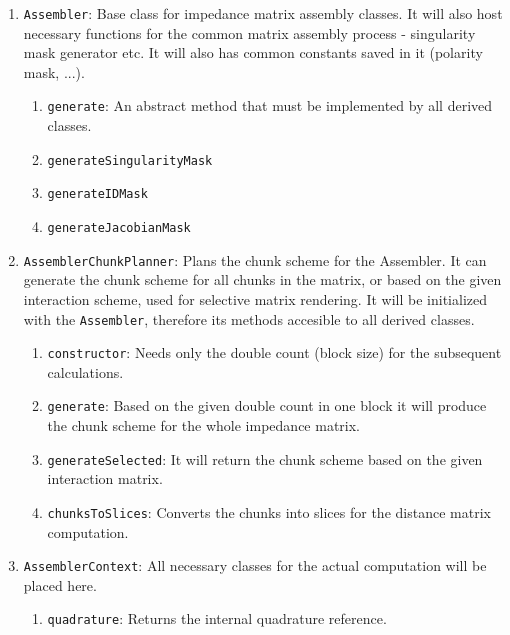 \documentclass[9pt]{article}
\begin{document}
\begin{enumerate}[label=\Roman*.]
\begin{enumerate}[label=\roman*.]
            \item \texttt{generateSameDir}
            \item \texttt{generateCrossDir}
        \end{enumerate}
        \item \texttt{Assembler}: Base class for impedance matrix assembly classes. It will also host necessary functions for the common matrix assembly process - singularity mask generator etc. It will also has common constants saved in it (polarity mask, ...).
        \begin{enumerate}[label=\roman*.]
            \item \texttt{generate}: An abstract method that must be implemented by all derived classes.
            \item \texttt{generateSingularityMask}
            \item \texttt{generateIDMask}
            \item \texttt{generateJacobianMask}
        \end{enumerate}
        \item \texttt{AssemblerChunkPlanner}: Plans the chunk scheme for the Assembler. It can generate the chunk scheme for all chunks in the matrix, or based on the given interaction scheme, used for selective matrix rendering. It will be initialized with the \texttt{Assembler}, therefore its methods accesible to all derived classes.
        \begin{enumerate}[label=\roman*.]
            \item \texttt{constructor}: Needs only the double count (block size) for the subsequent calculations.
            \item \texttt{generate}: Based on the given double count in one block it will produce the chunk scheme for the whole impedance matrix.
            \item \texttt{generateSelected}: It will return the chunk scheme based on the given interaction matrix.
            \item \texttt{chunksToSlices}: Converts the chunks into slices for the distance matrix computation.
        \end{enumerate}
        \item \texttt{AssemblerContext}: All necessary classes for the actual computation will be placed here.
        \begin{enumerate}[label=\roman*.]
            \item \texttt{quadrature}: Returns the internal quadrature reference.

\end{enumerate}
\end{enumerate}
\end{document}
